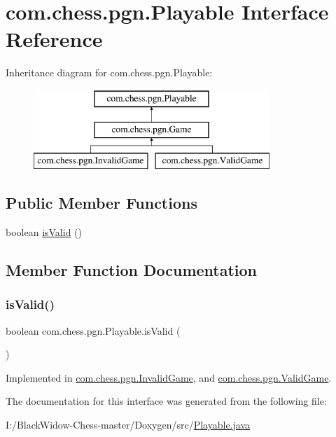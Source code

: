 \hypertarget{interfacecom_1_1chess_1_1pgn_1_1_playable}{}\section{com.\+chess.\+pgn.\+Playable Interface Reference}
\label{interfacecom_1_1chess_1_1pgn_1_1_playable}
Inheritance diagram for com.\+chess.\+pgn.\+Playable\+:\begin{figure}[H]
\begin{center}
\leavevmode
\includegraphics[height=3.000000cm]{interfacecom_1_1chess_1_1pgn_1_1_playable}
\end{center}
\end{figure}
\subsection*{Public Member Functions}
\begin{DoxyCompactItemize}
\item 
boolean \mbox{\hyperlink{interfacecom_1_1chess_1_1pgn_1_1_playable_a57cbba467e07e07bf9fe35144a970ce6}{is\+Valid}} ()
\end{DoxyCompactItemize}


\subsection{Member Function Documentation}
\mbox{\label{interfacecom_1_1chess_1_1pgn_1_1_playable_a57cbba467e07e07bf9fe35144a970ce6}} 
\subsubsection{\texorpdfstring{isValid()}{isValid()}}
{\footnotesize\ttfamily boolean com.\+chess.\+pgn.\+Playable.\+is\+Valid (\begin{DoxyParamCaption}{ }\end{DoxyParamCaption})}



Implemented in \mbox{\hyperlink{classcom_1_1chess_1_1pgn_1_1_invalid_game_a482beca1cd8dabe2189a4fb82ec31020}{com.\+chess.\+pgn.\+Invalid\+Game}}, and \mbox{\hyperlink{classcom_1_1chess_1_1pgn_1_1_valid_game_a4ec1fb23ee3461e3a089b298e75999d9}{com.\+chess.\+pgn.\+Valid\+Game}}.



The documentation for this interface was generated from the following file\+:\begin{DoxyCompactItemize}
\item 
I\+:/\+Black\+Widow-\/\+Chess-\/master/\+Doxygen/src/\mbox{\hyperlink{_playable_8java}{Playable.\+java}}\end{DoxyCompactItemize}
